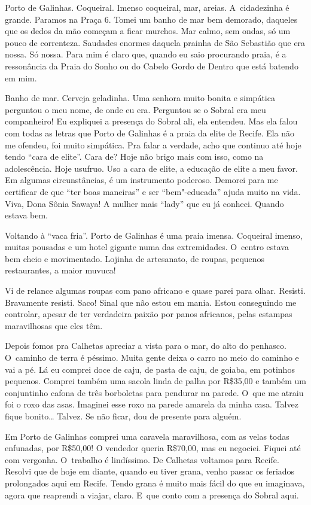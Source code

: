 Porto de Galinhas. Coqueiral. Imenso coqueiral, mar, areias. A~cidadezinha é grande. Paramos na Praça 6. Tomei um banho de mar bem
demorado, daqueles que os dedos da mão começam a ficar murchos. Mar
calmo, sem ondas, só um pouco de correnteza. Saudades enormes daquela
prainha de São Sebastião que era nossa. Só nossa. Para mim é claro que,
quando eu saio procurando praia, é a ressonância da Praia do Sonho ou
do Cabelo Gordo de Dentro que está batendo em mim.

Banho de mar. Cerveja geladinha. Uma senhora muito bonita e simpática
perguntou o meu nome, de onde eu era. Perguntou se o Sobral era meu
companheiro! Eu expliquei a presença do Sobral ali, ela
entendeu. Mas ela falou com todas as letras que Porto de Galinhas é a
praia da elite de Recife. Ela não me ofendeu, foi muito simpática. Pra
falar a verdade, acho que continuo até hoje tendo ``cara de elite''.
Cara de? Hoje não brigo mais com isso, como na adolescência. Hoje
usufruo. Uso a cara de elite, a educação de elite a meu favor. Em
algumas circunstâncias, é um instrumento poderoso. Demorei para me
certificar de que ``ter boas maneiras'' e ser ``bem"-educada'' ajuda
muito na vida. Viva, Dona Sônia Sawaya! A mulher mais ``lady'' que eu já
conheci. Quando estava bem.

Voltando à ``vaca fria''. Porto de Galinhas é uma praia imensa.
Coqueiral imenso, muitas pousadas e um hotel gigante numa das
extremidades. O~centro estava bem cheio e movimentado. Lojinha de
artesanato, de roupas, pequenos restaurantes, a maior muvuca!

Vi de relance algumas roupas com pano africano e quase parei para olhar.
Resisti. Bravamente resisti. Saco! Sinal que não estou em mania. Estou
conseguindo me controlar, apesar de ter verdadeira paixão por panos
africanos, pelas estampas maravilhosas que eles têm.

Depois fomos pra Calhetas apreciar a vista para o mar, do alto do
penhasco. O~caminho de terra é péssimo. Muita gente deixa o carro no
meio do caminho e vai a pé. Lá eu comprei doce de caju, de pasta de
caju, de goiaba, em potinhos pequenos. Comprei também uma sacola linda
de palha por R\$35,00 e também um conjuntinho cafona de três borboletas
para pendurar na parede. O~que me atraiu foi o roxo das asas. Imaginei
esse roxo na parede amarela da minha casa. Talvez fique bonito…
Talvez. Se não ficar, dou de presente para alguém.

Em Porto de Galinhas comprei uma caravela maravilhosa, com as velas
todas enfunadas, por R\$50,00! O vendedor queria R\$70,00, mas eu
negociei. Fiquei até com vergonha. O~trabalho é lindíssimo. De Calhetas
voltamos para Recife. Resolvi que de hoje em diante, quando eu tiver
grana, venho passar os feriados prolongados aqui em Recife. Tendo grana
é muito mais fácil do que eu imaginava, agora que reaprendi a viajar,
claro. E~que conto com a presença do Sobral aqui.

